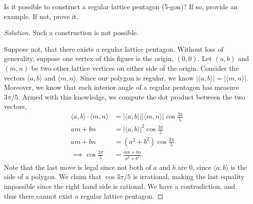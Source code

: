 \documentclass[12pt]{article}
\newenvironment{exercise}[2][Exercise]{\begin{trivlist}
        \item[\hskip \labelsep {\bfseries #1}\hskip \labelsep {\bfseries #2.}]}{\end{trivlist}}
\newenvironment{solution}
        {\begin{proof}[Solution]}
                    {\end{proof}}
\begin{document}
\begin{exercise}{3}
    Is it possible to construct a regular lattice pentagon (5-gon)? If so, provide an example. If not, prove it.
    \begin{solution}
        Such a construction is not possible.

        Suppose not, that there exists a regular lattice pentagon. Without loss of generality, suppose one vertex of this figure is the origin, \( ( 0,0 ). \) Let \( (a,b) \) and \( ( m,n ) \) be two other lattice vertices on either side of the origin. Consider the vectors \( \langle a,b \rangle \) and \( \langle m,n \rangle . \) Since our polygon is regular, we know \( \left| \langle a,b \rangle \right| = \left| \langle m,n \rangle \right| .\) Moreover, we know that each interior angle of a regular pentagon has measure \( 3\pi/5. \) Armed with this knowledge, we compute the dot product between the two vectors,
        \begin{align*}
            \langle a,b \rangle \cdot \langle m,n \rangle &= \left|\langle a,b\rangle \right| \left|\langle m,n \rangle\right| \cos \frac{3\pi}{5}  \\
            am + bn &= \left| \langle a,b \rangle \right|^{2} \cos \frac{3\pi}{5} \\
            am + bn &= (a^{2} + b^{2} ) \cos \frac{3\pi}{5} \\
            \implies\cos \frac{3\pi}{5} &= \frac{am+bn}{a^{2} + b^{2}} .
        \end{align*}
        Note that the last move is legal since not both of \( a \) and \( b \) are 0, since \( \langle a,b \rangle \) is the side of a polygon. We claim that \( \cos 3\pi/5 \) is irrational, making the last equality impossible since the right hand side is rational. We have a contradiction, and thus there cannot exist a regular lattice pentagon.
    \end{solution}
\end{exercise}
\end{document}
